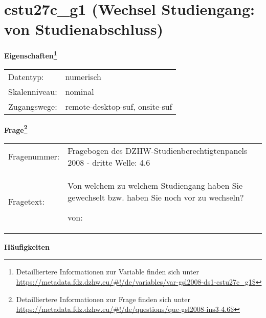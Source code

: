 
    \setcounter{footnote}{0}

    \vspace*{-1.8cm}
	\section{cstu27c\_g1 (Wechsel Studiengang: von Studienabschluss)}
	\label{section:cstu27c_g1}



    \vspace*{0.5cm}
    \noindent\textbf{Eigenschaften\footnote{Detailliertere Informationen zur Variable finden sich unter
		\url{https://metadata.fdz.dzhw.eu/\#!/de/variables/var-gsl2008-ds1-cstu27c_g1$}}}\\
	\begin{tabularx}{\hsize}{@{}lX}
	Datentyp: & numerisch \\
	Skalenniveau: & nominal \\
	Zugangswege: &
	  remote-desktop-suf, 
	  onsite-suf
 \\
    \end{tabularx}



				\vspace*{0.5cm}
                \noindent\textbf{Frage\footnote{Detailliertere Informationen zur Frage finden sich unter
		              \url{https://metadata.fdz.dzhw.eu/\#!/de/questions/que-gsl2008-ins3-4.6$}}}\\
				\begin{tabularx}{\hsize}{@{}lX}
					Fragenummer: &
					  Fragebogen des DZHW-Studienberechtigtenpanels 2008 - dritte Welle:
					  4.6
 \\
					Fragetext: & Von welchem zu welchem Studiengang haben Sie gewechselt bzw. haben Sie noch vor zu wechseln?\par  von: \\
				\end{tabularx}





        		\vspace*{0.5cm}
                \noindent\textbf{Häufigkeiten}

